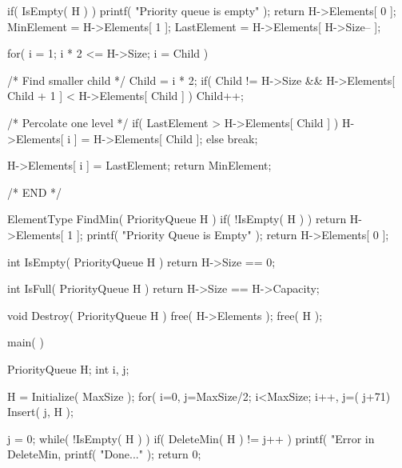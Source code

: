 \documentclass[12pt, a4paper]{article}
\begin{document}
\begin{code}
{	if( IsEmpty( H ) )
	{
		printf( "Priority queue is empty" );
		return H->Elements[ 0 ];
	}
	MinElement = H->Elements[ 1 ];
	LastElement = H->Elements[ H->Size-- ];

	for( i = 1; i * 2 <= H->Size; i = Child )
	{
		/* Find smaller child */
		Child = i * 2;
		if( Child != H->Size && H->Elements[ Child + 1 ] < H->Elements[ Child ] )
			Child++;

		/* Percolate one level */
		if( LastElement > H->Elements[ Child ] )
			H->Elements[ i ] = H->Elements[ Child ];
		else
			break;
	}
	H->Elements[ i ] = LastElement;
	return MinElement;
}
/* END */

ElementType FindMin( PriorityQueue H )
{
	if( !IsEmpty( H ) )
		return H->Elements[ 1 ];
	printf( "Priority Queue is Empty" );
	return H->Elements[ 0 ];
	}

int IsEmpty( PriorityQueue H )
{
	return H->Size == 0;
}

int IsFull( PriorityQueue H )
{
	return H->Size == H->Capacity;
}

void Destroy( PriorityQueue H )
{
	free( H->Elements );
	free( H );
}

main( )
{
    PriorityQueue H;
    int i, j;

    H = Initialize( MaxSize );
    for( i=0, j=MaxSize/2; i<MaxSize; i++, j=( j+71)%
        Insert( j, H );

    j = 0;
    while( !IsEmpty( H ) )
        if( DeleteMin( H ) != j++ )
            printf( "Error in DeleteMin, %
    printf( "Done...\n" );
    return 0;
}
\end{code}
\end{document}
